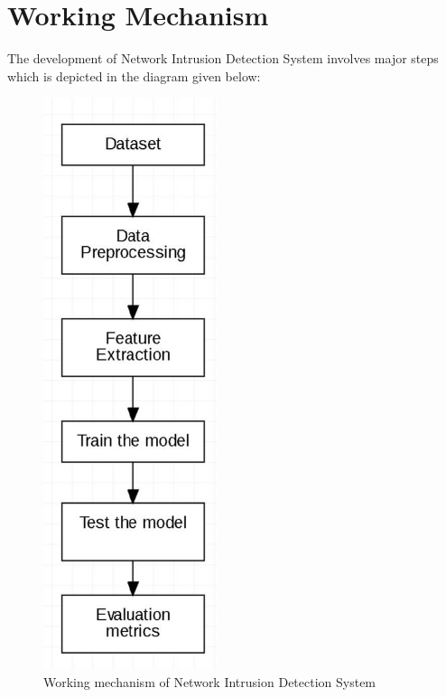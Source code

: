 \section{Working Mechanism}
\vspace{-18pt}
The development of Network Intrusion Detection System involves major steps which is 
depicted in the diagram given below:
\begin{figure}[tbh] %
\begin{center}
	\includegraphics[width=2in]{images/ww1.jpg} 
	\caption{Working mechanism of Network Intrusion Detection System} %
	\label{Working mechanism of Network Intrusion Detection System} %
\end{center}
\end{figure}

